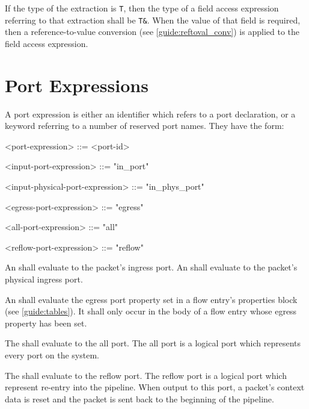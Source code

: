 If the type of the extraction is \texttt{T}, then the type of a field access expression referring to that extraction shall be \texttt{T\&}. When the value of that field is required, then a reference-to-value conversion (see \ref{guide:reftoval_conv}) is applied to the field access expression.

\section{Port Expressions} \label{guide:port_expr}

A port expression is either an identifier which refers to a port declaration, or a keyword referring to a number of reserved port names. They have the form:

\begin{minip}
\begin{grammar}
<port-expression> ::= <port-id>

<input-port-expression> ::= "in_port"

<input-physical-port-expression> ::= "in_phys_port"

<egress-port-expression> ::= "egress"

<all-port-expression> ::= "all"

<reflow-port-expression> ::= "reflow"
\end{grammar}
\end{minip} 

An  shall evaluate to the packet's ingress port.
An  shall evaluate to the packet's physical ingress port.

An  shall evaluate the egress port property set in a flow entry's properties block (see \ref{guide:tables}). It shall only occur in the body of a flow entry whose egress property has been set.

The  shall evaluate to the all port. The all port is a logical port which represents every port on the system.

The  shall evaluate to the reflow port. The reflow port is a logical port which represent re-entry into the pipeline. When output to this port, a packet's context data is reset and the packet is sent back to the beginning of the pipeline.

